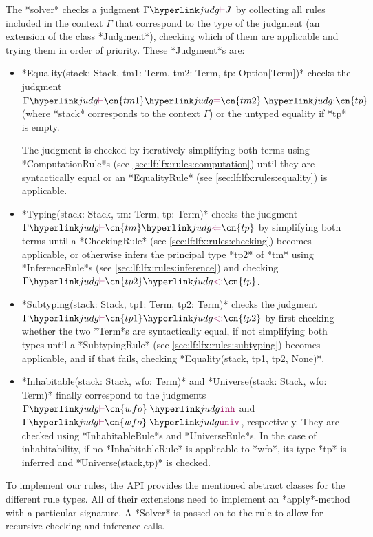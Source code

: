 The *solver* checks a judgment $\gjudg J$ by collecting all rules included in the context $\Gamma$ that correspond to the type of the judgment (an extension of the class *Judgment*), checking which of them are applicable and trying them in order of priority. These *Judgment*s are:
\begin{itemize} 
	\item *Equality(stack: Stack, tm1: Term, tm2: Term, tp: Option[Term])* checks the judgment $\gjudg{\judgeq{\cn{\smaller tm1}}{\cn{\smaller tm2}}{\cn{\smaller tp}}}$ (where *stack* corresponds to the context $\Gamma$) or the untyped equality if *tp* is empty.
	
	The judgment is checked by iteratively simplifying both terms using *ComputationRule*s (see \autoref{sec:lf:lfx:rules:computation}) until they are syntactically equal or an *EqualityRule* (see \autoref{sec:lf:lfx:rules:equality}) is applicable.
	\item *Typing(stack: Stack, tm: Term, tp: Term)* checks the judgment $\gjudg{\hastype{\cn{tm}}{\cn{tp}}}$ by simplifying both terms until a *CheckingRule* (see \autoref{sec:lf:lfx:rules:checking}) becomes applicable, or otherwise infers the principal type *tp2* of *tm* using *InferenceRule*s (see \autoref{sec:lf:lfx:rules:inference}) and checking $\gjudg{\subtp {\cn{tp2}}{\cn{tp}}}$.
	\item *Subtyping(stack: Stack, tp1: Term, tp2: Term)* checks the judgment $\gjudg{\subtp{\cn{tp1}}{\cn{tp2}}}$ by first checking whether the two *Term*s are syntactically equal, if not simplifying both types until a *SubtypingRule* (see \autoref{sec:lf:lfx:rules:subtyping}) becomes applicable, and if that fails, checking *Equality(stack, tp1, tp2, None)*.
	\item *Inhabitable(stack: Stack, wfo: Term)* and *Universe(stack: Stack, wfo: Term)* finally correspond to the judgments $\gjudg{\judginh{\cn{wfo}}}$ and $\gjudg{\judguniv{\cn{wfo}}}$, respectively. They are checked using *InhabitableRule*s and *UniverseRule*s. In the case of inhabitability, if no *InhabitableRule* is applicable to *wfo*, its type *tp* is inferred and *Universe(stack,tp)* is checked.
\end{itemize}

To implement our rules, the \mmt API provides the mentioned abstract classes for the different rule types. All of their extensions need to implement an *apply*-method with a particular signature. A *Solver* is passed on to the rule to allow for recursive checking and inference calls.

